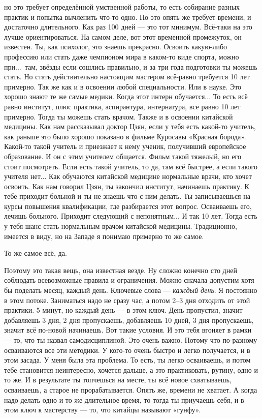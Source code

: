 но это требует
определённой умственной работы, то есть собирание разных практик и попытка вычленить что-то
одно.\hfil\break
\indent
Но это опять же требует времени, и достаточно длительного. Как раз 100 дней --- это тот
минимум. Всё-таки на это
лучше ориентироваться.\hfil\break
\indent
На самом деле, вот этот временной промежуток, он известен.
Ты, как
психолог, это знаешь
прекрасно. Освоить какую-либо профессию или стать даже чемпионом мира в каком-то виде
спорта, можно при...\ там,
звёзды если сошлись правильно, и за три года подготовки ты можешь стать.
Но стать действительно настоящим мастером всё-равно требуется 10 лет примерно. Так же как и в
освоении любой
специальности. Или в науке. Это хорошо знают те же самые медики. Когда этот интерн
обучается... То есть всё равно
институт, плюс практика, аспирантура, интернатура, все равно 10 лет примерно. Тогда ты можешь стать
врачом.\hfil\break
\indent
Также и в освоении китайской медицины. Как нам рассказывал доктор Цзян, если у тебя есть
какой-то учитель, как раньше это было хорошо показано в фильме Куросавы «Красная борода».
Какой-то такой учитель и приезжает к нему
ученик, получивший европейское образование. И он с этим учителем общается. Фильм такой тяжелый,
но его стоит
посмотреть. Если есть такой учитель, то да, там всё быстрее, а если такого учителя
нет... Как обучаются
китайской медицине нормальные врачи, кто хочет освоить. Как нам говорил Цзян, ты закончил
институт, начинаешь
практику. К тебе приходит больной и ты не знаешь что с ним делать. Ты записываешься на
курсы повышения
квалификации, где разбирается этот вопрос. Осваиваешь его, лечишь
больного. Приходит следующий
с непонятным... И так 10 лет. Тогда есть у тебя шанс стать нормальным врачом китайской
медицины.\hfil\break
\indent
Традиционно, имеется в виду, но на Западе я понимаю примерно то же самое.

\A
То же самое всё, да.

\T
Поэтому это такая вещь, она известная везде.
Ну сложно конечно сто дней соблюдать всевозможные правила и
ограничения.
Можно сначала допустим хотя бы поделать месяц, каждый день. Ключевые
слова --- {\it каждый день}. Я постоянно в этом потоке.
Заниматься надо не
сразу час, а потом 2--3 дня отходить от этой практики. 5 минут, но каждый день --- в этом
ключ. День пропустил, значит добавляешь 3 дня, 2 дня пропускаешь, добавляешь 10 дней, 3 дня
пропускаешь, значит
всё по-новой начинаешь. Вот такие условия. И это тебя вгоняет в рамки --- то, что ты назвал
самодисциплиной.\hfil\break
\indent
Это очень важно. Потому что по-разному осваиваются все эти методики. У кого-то очень быстро и
легко получается, и в этом
засада. У меня была эта проблема. То есть, ты легко осваиваешь, и потом тебе
становится неинтересно, хочется
дальше, а это практиковать, рутину, одно и то же. И в результате ты топчешься на месте, ты
всё новое схватываешь,
осваиваешь, а старое не прорабатывается.\hfil\break
\indent
Опять же, времени не хватает. А когда надо делать одно и то же длительное время, то тогда ты
приучаешь себя, и в этом
ключ к мастерству --- то, что китайцы называют «гунфу».

